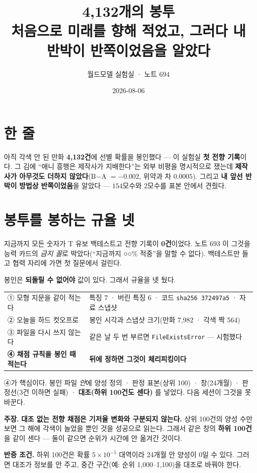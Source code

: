 \documentclass[10pt,a4paper]{article}
\title{\bfseries 4{,}132개의 봉투\\[2pt]
\large 처음으로 미래를 향해 적었고, 그러다 내 반박이 반쪽이었음을 알았다}
\author{월드모델 실험실 · 노트 694}
\date{2026-08-06}
\newcommand{\claim}[2]{\begin{claimbox}\textbf{주장.} #1\par\smallskip
  \textcolor{gray!70}{\textbf{반증 조건.} #2}\end{claimbox}}
\begin{document}
\maketitle

\section{한 줄}

아직 각색 안 된 만화 \textbf{4{,}132건}에 선별 확률을 봉인했다 --- 이 실험실
\textbf{첫 전향 기록}이다. 그 김에 ``애니 흥행은 제작사가 지배한다''는 외부
비평을 명시적으로 쟀는데 \textbf{제작사가 아무것도 더하지 않았다}(B$-$A $=-0.002$,
위약과 차 $0.0005$). 그리고 \textbf{내 앞선 반박이 방법상 반쪽이었음}을 알았다 ---
$154$모수와 $2$모수를 표본 안에서 견줬다.

\section{봉투를 봉하는 규율 넷}

지금까지 모든 숫자가 T 유보 백테스트고 전향 기록이 \textbf{0건}이었다. 노트 693 이
그것을 능력 카드의 \emph{금지 꼴}로 박았다(``지금까지 ○○\% 적중''을 말할 수 없다).
백테스트만 들고 협력 자리에 가면 첫 질문에서 걸린다.

봉인은 \textbf{되돌릴 수 없어야} 값이 있다. 그래서 규율을 넷 뒀다.

\begin{center}
\begin{tabular}{ll}
\toprule
① 모형 지문을 같이 적는다 & 특징 7 · 버린 특징 6 · 코드 \texttt{sha256 372497a5} · 자료 스냅샷 \\
② 오늘을 하드 컷오프로 & 봉인 시각과 스냅샷 크기(만화 7{,}982 · 각색 짝 564) \\
③ 파일을 다시 쓰지 않는다 & 같은 날 두 번 부르면 \texttt{FileExistsError} --- 시험했다 \\
\textbf{④ 채점 규칙을 봉인 때 적는다} & \textbf{뒤에 정하면 그것이 체리피킹이다} \\
\bottomrule
\end{tabular}
\end{center}

④가 핵심이다. 봉인 파일 \emph{안}에 양성 정의 · 판정 표본(상위 100) · 창(24개월) ·
판정선(3건 이하면 실패) · \textbf{대조(하위 100건도 센다)} 를 넣었다. 다음 세션이
그것을 못 바꾼다.

\claim{\textbf{대조 없는 전향 채점은 기저율 변화와 구분되지 않는다.} 상위 100건의
양성 수만 보면 그 해에 각색이 늘었을 뿐인 것을 성공으로 읽는다. 그래서 같은 창의
\textbf{하위 100건}을 같이 센다 --- 둘이 같으면 순위가 시간에 안 옮겨간 것이다.}
{하위 100건은 확률 $5\times10^{-5}$ 대역이라 24개월 안 양성이 0일 수 있다. 그러면
대조가 정보를 안 주고, 중간 구간(예: 순위 1{,}000--1{,}100)을 대조로 바꿔야 한다.}
\end{document}
